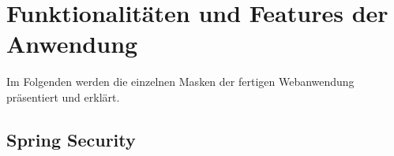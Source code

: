 \documentclass[fontsize=12pt,openright,oneside,paper=a4,BCOR=1cm]{scrbook}
\begin{document}














\section{Funktionalitäten und Features der Anwendung}

Im Folgenden werden die einzelnen Masken der fertigen Webanwendung präsentiert und erklärt.

\subsection{Spring Security}
\end{document}
